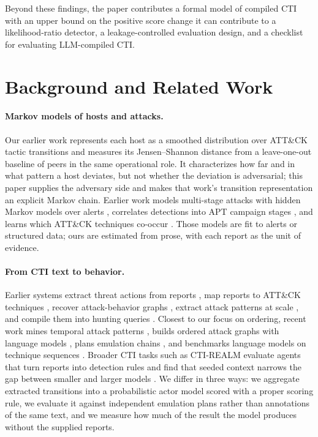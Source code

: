 \documentclass[letterpaper]{article}
\begin{document}
Beyond these findings, the paper contributes a formal model of compiled CTI with an upper bound on the positive score change it can contribute to a likelihood-ratio detector, a leakage-controlled evaluation design, and a checklist for evaluating LLM-compiled CTI.

\section{Background and Related Work}

\paragraph{Markov models of hosts and attacks.} Our earlier work \citep{moody2026drift} represents each host as a smoothed distribution over ATT\&CK tactic transitions and measures its Jensen--Shannon distance from a leave-one-out baseline of peers in the same operational role. It characterizes how far and in what pattern a host deviates, but not whether the deviation is adversarial; this paper supplies the adversary side and makes that work's transition representation an explicit Markov chain. Earlier work models multi-stage attacks with hidden Markov models over alerts \citep{ourston2003hmm}, correlates detections into APT campaign stages \citep{milajerdi2019holmes}, and learns which ATT\&CK techniques co-occur \citep{alshaer2020associations}. Those models are fit to alerts or structured data; ours are estimated from prose, with each report as the unit of evidence.

\paragraph{From CTI text to behavior.} Earlier systems extract threat actions from reports \citep{husari2017ttpdrill}, map reports to ATT\&CK techniques \citep{legoy2020rcatt,mitre2023tram}, recover attack-behavior graphs \citep{satvat2021extractor}, extract attack patterns at scale \citep{alam2023ladder}, and compile them into hunting queries \citep{gao2021threatraptor}. Closest to our focus on ordering, recent work mines temporal attack patterns \citep{rahman2024chronocti}, builds ordered attack graphs with language models \citep{zhang2025attackgplus}, plans emulation chains \citep{wang2024aurora}, and benchmarks language models on technique sequences \citep{ma2025attackseqbench}. Broader CTI tasks \citep{alam2024ctibench} such as CTI-REALM evaluate agents that turn reports into detection rules and find that seeded context narrows the gap between smaller and larger models \citep{chakraborty2026ctirealm}. We differ in three ways: we aggregate extracted transitions into a probabilistic actor model scored with a proper scoring rule, we evaluate it against independent emulation plans rather than annotations of the same text, and we measure how much of the result the model produces without the supplied reports.
\end{document}
